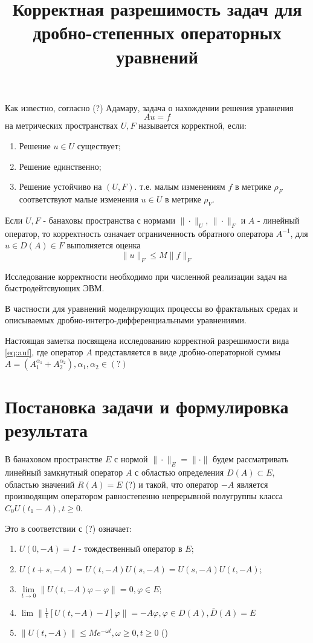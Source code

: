 \documentclass{article}
\title{\textbf{Корректная разрешимость задач для дробно-степенных операторных уравнений}}
\author{}
\date{}
\begin{document}
\maketitle

Как известно, согласно (?) Адамару, задача о нахождении решения уравнения
\begin{equation}
    \label{eq:auf}
    Au = f
\end{equation}
на метрических пространствах $U, F$ называется корректной, если:
\begin{enumerate}
    \item Решение $u \in U$ существует;
    \item Решение единственно;
    \item Решение устойчиво на $(U, F)$. т.е. малым изменениям $f$ в метрике $\rho_F$
    соответствуют малые изменения $u \in U$ в метрике $\rho_V$.
\end{enumerate}

Если $U, F$ - банаховы пространства с нормами $\|\cdot\|_U$, $\|\cdot\|_F$ и $A$ - линейный
оператор, то корректность означает ограниченность обратного оператора $A^{-1}$, для
$u \in D(A) \in F$ выполняется оценка
\begin{equation}
    \|u\|_F \le M\|f\|_F
\end{equation}

Исследование корректности необходимо при численной реализации задач на быстродейтсвующих ЭВМ.

В частности для уравнений моделирующих процессы во фрактальных средах и описываемых дробно-интегро-дифференциальными
уравнениями.

Настоящая заметка посвящена исследованию корректной разрешимости вида \eqref{eq:auf}, где оператор
$A$ представляется в виде дробно-операторной суммы
$A = (A_1^{\alpha_1} + A_2^{\alpha_2}), \alpha_1, \alpha_2 \in (?)$


\section*{Постановка задачи и формулировка результата}

В банаховом пространстве $E$ с нормой $\|\cdot\|_E = \|\cdot\|$ будем рассматривать линейный замкнутный
оператор $A$ с областью определения $D(A) \subset E$, областью значений $R(A) = E$ (?) и такой, что
оператор $-A$ является производящим оператором равностепенно непрерывной полугруппы класса
$C_0 U(t_1 - A), t \ge 0$.

Это в соответствии с (?) означает:
\begin{enumerate}
    \item $U(0, -A) = I$ - тождественный оператор в $E$;
    \item $U(t+s, -A) = U(t, -A)U(s, -A) = U(s, -A)U(t, -A)$;
    \item $\lim\limits_{t\to0} \|U(t, -A)\varphi-\varphi\| = 0, \varphi \in E$;
    \item $\lim{} \|\frac{1}{t}[U(t, -A)-I]\varphi\| = -A\varphi, \varphi \in D(A), \bar{D}(A) = E$
    \item $\|U(t, -A)\| \le Me^{-\omega t}, \omega \ge 0, t \ge 0$
    \hfill{}(\theequation)
\end{enumerate}
\end{document}
